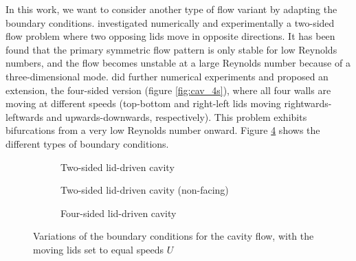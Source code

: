 In this work, we want to consider another type of flow variant by adapting the
boundary conditions. \cite{kuhlmann1997} investigated numerically and
experimentally a two-sided flow problem where two opposing lids move in
opposite directions. It has been found that the primary symmetric flow pattern
is only stable for low Reynolds numbers, and the flow becomes unstable at a
large Reynolds number because of a three-dimensional mode. \citep{wahba2009}
did further numerical experiments and proposed an extension, the four-sided
version (figure \ref{fig:cav_4s}), where all four walls are moving at different
speeds (top-bottom and right-left lids moving rightwards-leftwards and
upwards-downwards, respectively). This problem exhibits bifurcations from a
very low Reynolds number onward. Figure \ref{fig:bc_types} shows the different
types of boundary conditions.

\begin{figure}[h]
\centering
\begin{subfigure}[b]{0.3\textwidth}
  \centering
  \caption{Two-sided lid-driven cavity \\ \hspace{\textwidth}}
  \label{subfig:bc_2s}
\end{subfigure}
\begin{subfigure}[b]{0.3\textwidth}
  \centering
  \caption{Two-sided lid-driven cavity (non-facing)}
  \label{subfig:bc_2s_nf}
\end{subfigure}
\begin{subfigure}[b]{0.3\textwidth}
  \centering
  \caption{Four-sided lid-driven cavity \\ \hspace{\textwidth}}
  \label{subfig:bc_4s}
\end{subfigure}

\caption{Variations of the boundary conditions for the cavity flow,
 with  the moving lids set to equal speeds $U$}
\label{fig:bc_types}
\end{figure}

